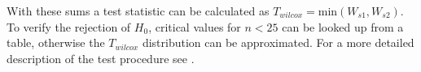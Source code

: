 With these sums a test statistic can be calculated as $T_{wilcox}  = \mathrm{min}(W_{s1}, W_{s2}).$ To verify the rejection of $H_0$, critical values for $n < 25$ can be looked up from a table, otherwise the $T_{wilcox}$ distribution can be approximated. For a more detailed description of the test procedure see \citep[p.~234]{japkowicz2011evaluating}.
